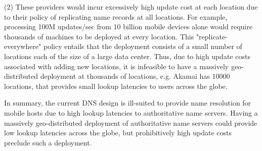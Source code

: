 {(2) These providers would incur excessively high update cost at each location due to their policy of replicating name records at all locations. For example, processing 100M updates/sec from 10 billion mobile devices alone would require thousands of machines to be deployed at every location. This "replicate-everywhere" policy entails that the deployment consists of a small number of locations each of the size of a large data center. Thus, due to high update costs associated with adding new locations, it is infeasible to have a massively geo-distributed deployment at thousands of locations, e.g. Akamai has 10000 locations, that provides small lookup latencies to users across the globe. 

In summary, the current DNS design is ill-suited to provide name resolution for mobile hosts due to high lookup latencies to authoritative name servers. Having a massively geo-distributed deployment of authoritative name servers could provide low lookup latencies across the globe, but prohibitively high update costs preclude such a deployment. 
}
